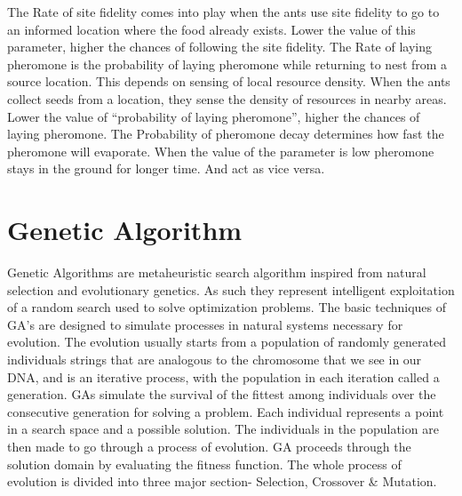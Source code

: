 The Rate of site fidelity comes into play when the ants use site fidelity to go to an informed location where the food already exists. Lower the value of this parameter, higher the chances of following the site fidelity. The Rate of laying pheromone is the probability of laying pheromone while returning to nest from a source location. This depends on sensing of local resource density. When the ants collect seeds from a location, they sense the density of resources in nearby areas. Lower the value of “probability of laying pheromone”, higher the chances of laying pheromone. The Probability of pheromone decay determines how fast the pheromone will evaporate. When the value of the parameter is low pheromone stays in the ground for longer time. And act as vice versa.
\section{\label{section:Genetic Algorithm}Genetic Algorithm}
Genetic Algorithms are metaheuristic search algorithm inspired from natural selection and evolutionary genetics. As such they represent intelligent exploitation of a random search used to solve optimization problems. The basic techniques of GA’s are designed to simulate processes in natural systems necessary for evolution. The evolution usually starts from a population of randomly generated individuals strings that are analogous to the chromosome that we see in our DNA, and is an iterative process, with the population in each iteration called a generation. GAs simulate the survival of the fittest among individuals over the consecutive generation for solving a problem. Each individual represents a point in a search space and a possible solution. The individuals in the population are then made to go through a process of evolution. GA proceeds through the solution domain by evaluating the fitness function. 
The whole process of evolution is divided into three major section- Selection, Crossover \& Mutation.

